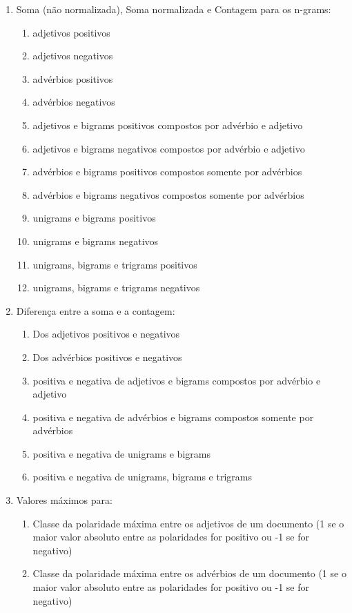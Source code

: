\documentclass[template.tex]{subfiles}
\begin{document}
\begin{enumerate}
  \item Soma (não normalizada), Soma normalizada e Contagem para os n-grams:
  \begin{enumerate}
     \item adjetivos positivos
     \item adjetivos negativos
     \item advérbios positivos
     \item advérbios negativos
     \item adjetivos e bigrams positivos compostos por advérbio e adjetivo
     \item adjetivos e bigrams negativos compostos por advérbio e adjetivo
     \item advérbios e bigrams positivos compostos somente por advérbios
	 \item advérbios e bigrams negativos compostos somente por advérbios
	 \item unigrams e bigrams positivos
	 \item unigrams e bigrams negativos
	 \item unigrams, bigrams e trigrams positivos 
	 \item unigrams, bigrams e trigrams negativos
  \end{enumerate}
  \item Diferença entre a soma e a contagem: 
  \begin{enumerate}
     \item Dos adjetivos positivos e negativos
     \item Dos advérbios positivos e negativos
     \item positiva e negativa de adjetivos e bigrams compostos por advérbio e adjetivo
     \item positiva e negativa de advérbios e bigrams compostos somente por advérbios
     \item positiva e negativa de unigrams e bigrams
     \item positiva e negativa de unigrams, bigrams e trigrams
  \end{enumerate}
  \item Valores máximos para:
  \begin{enumerate}
	\item Classe da polaridade máxima entre os adjetivos de um documento (1 se o maior valor absoluto entre as polaridades for positivo ou -1 se for negativo)
	\item Classe da polaridade máxima entre os advérbios de um documento (1 se o maior valor absoluto entre as polaridades for positivo ou -1 se for negativo)

\end{enumerate}
\end{enumerate}
\end{document}
